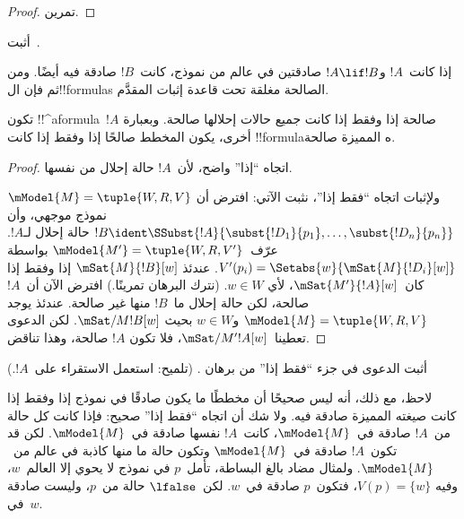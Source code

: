 \documentclass[../../../include/open-logic-section]{subfiles}
\begin{document}
\begin{proof}
  تمرين.
\end{proof}

\begin{prob}
  أثبت~.
\end{prob}

\begin{prop}
  إذا كانت~$!A$ و$!A \lif !B$ صادقتين في عالم من نموذج، كانت~$!B$
  صادقة فيه أيضًا. ومن ثم فإن ال!!{formula}s الصالحة مغلقة تحت قاعدة
  إثبات المقدَّم.
\end{prop}

\begin{prop}
  تكون !!^a{formula}~$!A$ صالحة إذا وفقط إذا كانت جميع حالات إحلالها
  صالحة. وبعبارة أخرى، يكون المخطط صالحًا إذا وفقط إذا كانت
  !!{formula}ه المميزة صالحة.
\end{prop}

\begin{proof}
  اتجاه ``إذا'' واضح، لأن~$!A$ حالة إحلال من نفسها.

  ولإثبات اتجاه ``فقط إذا''، نثبت الآتي: افترض أن
  $\mModel{M} = \tuple{W, R, V}$ نموذج موجهي، وأن
  $!B \ident \SSubst{!A}{\subst{!D_1}{p_1},\dots,\subst{!D_n}{p_n}}$
  حالة إحلال لـ$!A$. عرّف~$\mModel{M'} = \tuple{W, R, V'}$ بواسطة
  $V'(p_i) = \Setabs{w}{\mSat{M}{!D_i}[w]}$. عندئذ
  $\mSat{M}{!B}[w]$ إذا وفقط إذا كان~$\mSat{M'}{!A}[w]$، لأي
  $w \in W$. (نترك البرهان تمرينًا.) افترض الآن أن~$!A$ صالحة، لكن
  حالة إحلال ما~$!B$ منها غير صالحة. عندئذ يوجد
  $\mModel{M} = \tuple{W, R, V}$ و$w \in W$ بحيث
  $\mSat/{M}{!B}[w]$. لكن الدعوى تعطينا~$\mSat/{M'}{!A}[w]$، فلا تكون
  $!A$ صالحة، وهذا تناقض.
\end{proof}

\begin{prob}
  أثبت الدعوى في جزء ``فقط إذا'' من برهان
  . (تلميح: استعمل
  الاستقراء على~$!A$.)
\end{prob}

لاحظ، مع ذلك، أنه ليس صحيحًا أن مخططًا ما يكون صادقًا في نموذج إذا
وفقط إذا كانت صيغته المميزة صادقة فيه. ولا شك أن اتجاه ``فقط إذا''
صحيح: فإذا كانت كل حالة من~$!A$ صادقة في~$\mModel{M}$، كانت~$!A$
نفسها صادقة في~$\mModel{M}$. لكن قد تكون~$!A$ صادقة في~$\mModel{M}$
وتكون حالة ما منها كاذبة في عالم من~$\mModel{M}$. ولمثال مضاد بالغ
البساطة، تأمل~$p$ في نموذج لا يحوي إلا العالم~$w$، وفيه
$V(p) = \{w\}$، فتكون~$p$ صادقة في~$w$. لكن~$\lfalse$ حالة من~$p$،
وليست صادقة في~$w$.
\end{document}
